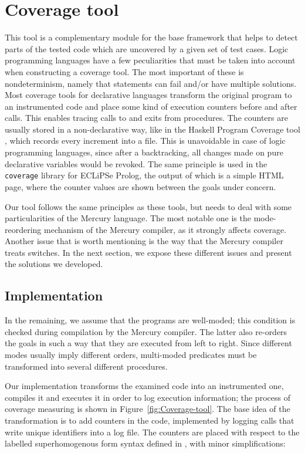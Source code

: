 \documentclass[british]{llncs}
\begin{document}
\section{Coverage tool}\label{sec:covtool}

This tool is a complementary module for the base framework that helps
to detect parts of the tested code which are uncovered by a given
set of test cases. Logic programming languages have a few peculiarities
that must be taken into account when constructing a coverage tool. The most important of these is nondeterminism, namely that
statements can fail and/or have multiple solutions. Most coverage
tools for declarative languages transform the original program to
an instrumented code and place some kind of execution counters before
and after calls. This enables tracing calls to and exits from
procedures. The counters are usually stored in a non-declarative way,
like in the Haskell Program Coverage tool \cite{DBLP:conf/haskell/GillR07},
which records every increment into a file. This is unavoidable in
case of logic programming languages, since after a backtracking, all
changes made on pure declarative variables would be revoked. The same
principle is used in the \texttt{coverage} library for ECLiPSe Prolog,
the output of which is a simple HTML page, where the counter values
are shown between the goals under concern.

Our tool follows the same principles as these tools, but needs
to deal with some particularities of the Mercury language. The most notable one is the mode-reordering mechanism of the Mercury compiler,
as it strongly affects coverage. Another issue that is worth mentioning
is the way that the Mercury compiler treats switches. 
In the next section, we expose these different issues and present the solutions we developed.


\subsection{Implementation}

In the remaining, we assume that the programs are well-moded; this condition is checked during compilation by the Mercury compiler. The latter also re-orders the goals in such a way that they are executed from left to right.
Since different modes
usually imply different orders, multi-moded predicates must be transformed
into several different procedures.

Our implementation transforms the examined code into an instrumented
one, compiles it and executes it in order to log execution
information; the process of coverage measuring is shown in
Figure~\ref{fig:Coverage-tool}. The base idea of the transformation
is to add counters in the code, implemented by logging calls that write unique identifiers into a log file. The counters are
placed with respect to the labelled superhomogenous
form syntax defined in \cite{DBLP:conf/lopstr/DegraveSV08}, with minor simplifications:
\end{document}
